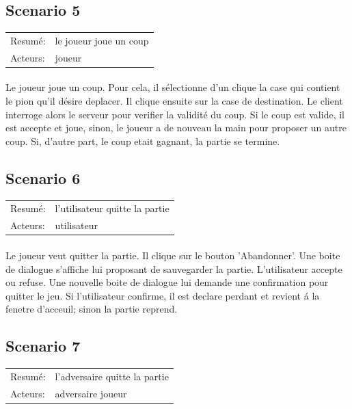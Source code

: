 \documentclass[french,12pt]{report}
\begin{document}
\subsection*{Scenario 5}

\begin{tabular}{ll}
  Resum\'e: & le joueur joue un coup \\
  Acteurs: & joueur
\end{tabular}

\paragraph{}    
  Le joueur joue un coup. Pour cela, il s\'electionne d'un clique la case 
qui contient le pion qu'il d\'esire deplacer. Il clique ensuite sur la 
case de destination.
  Le client interroge alors le serveur pour verifier la validit\'e du coup.
  Si le coup est valide, il est accepte et joue, sinon, le joueur a de 
nouveau la main pour proposer un autre coup.
  Si, d'autre part, le coup etait gagnant, la partie se termine.



\subsection*{Scenario 6}

\begin{tabular}{ll}
  Resum\'e: & l'utilisateur quitte la partie \\
  Acteurs: & utilisateur
\end{tabular}

\paragraph{}    
  Le joueur veut quitter la partie. Il clique sur le bouton 'Abandonner'.
  Une boite de dialogue s'affiche lui proposant de sauvegarder la partie. 
L'utilisateur accepte ou refuse.
  Une nouvelle boite de dialogue lui demande une confirmation pour quitter 
le jeu. Si l'utilisateur confirme, il est declare perdant et revient \'a la 
fenetre d'acceuil; sinon la partie reprend.




\subsection*{Scenario 7}

\begin{tabular}{ll}
  Resum\'e: & l'adversaire quitte la partie \\
  Acteurs: & adversaire
	     joueur
\end{tabular}
\end{document}
